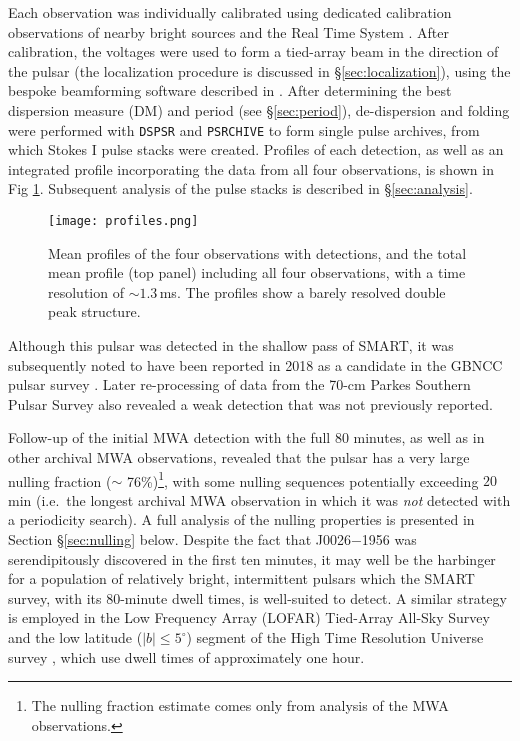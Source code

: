 \documentclass[twocolumn]{aastex631}
\newcommand{\psr}{J0026$-$1956}
\newcommand{\nullfraction}{76\%}
\begin{document}
Each observation was individually calibrated using dedicated calibration observations of nearby bright sources and the Real Time System \citep{Mitchell2008}.
After calibration, the voltages were used to form a tied-array beam in the direction of the pulsar (the localization procedure is discussed in \S\ref{sec:localization}), using the bespoke beamforming software described in \citet{Ord2019}.
After determining the best dispersion measure (DM) and period (see \S\ref{sec:period}), de-dispersion and folding were performed with {\tt DSPSR} \citep{VanStraten2011b} and {\tt PSRCHIVE} \citep{Hotan2004} to form single pulse archives, from which Stokes I pulse stacks were created.
Profiles of each detection, as well as an integrated profile incorporating the data from all four observations, is shown in Fig \ref{fig:profiles}.
Subsequent analysis of the pulse stacks is described in \S\ref{sec:analysis}.
\begin{figure}[!th]
    \centering
    \texttt{[image: profiles.png]}
    \caption{Mean profiles of the four observations with detections, and the total mean profile (top panel) including all four observations, with a time resolution of $\sim 1.3\,$ms. The profiles show a barely resolved double peak structure.}
    \label{fig:profiles}
\end{figure}

Although this pulsar was detected in the shallow pass of SMART, it was subsequently noted to have been reported in 2018 as a candidate in the GBNCC pulsar survey \citep{Stovall2014}.
Later re-processing of data from the 70-cm Parkes Southern Pulsar Survey  \citep{Manchester1996} also revealed a weak detection that was not previously reported.

Follow-up of the initial MWA detection with the full 80 minutes, as well as in other archival MWA observations, revealed that the pulsar has a very large nulling fraction ($\sim$ \nullfraction{})\footnote{The nulling fraction estimate comes only from analysis of the MWA observations.}, with some nulling sequences potentially exceeding $20\,$min (i.e.\ the longest archival MWA observation in which it was \textit{not} detected with a periodicity search).
A full analysis of the nulling properties is presented in Section \S\ref{sec:nulling} below.
Despite the fact that \psr{} was serendipitously discovered in the first ten minutes, it may well be the harbinger for a population of relatively bright, intermittent pulsars which the SMART survey, with its $80$-minute dwell times, is well-suited to detect.
A similar strategy is employed in the Low Frequency Array (LOFAR) Tied-Array All-Sky Survey \citep[LOTAAS][]{Sanidas2019} and the low latitude ($|b| \le 5^\circ$) segment of the High Time Resolution Universe survey \citep[HTRU][]{Keith2010}, which use dwell times of approximately one hour.
\end{document}
